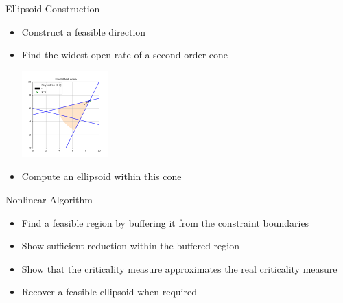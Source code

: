 \documentclass{beamer}
\begin{document}
\begin{frame}{Ellipsoid Construction}
	\begin{itemize}
		\item Construct a feasible direction
		\item Find the widest open rate of a second order cone
		\begin{center}
			\includegraphics[width=125px]{images/unshifted_cone.png}
		\end{center}
		\item Compute an ellipsoid within this cone
	\end{itemize}
\end{frame}

% 	

% 


\begin{frame}{Nonlinear Algorithm}
	\begin{itemize}
		\setlength\itemsep{1.5em}
		\item Find a feasible region by buffering it from the constraint boundaries
		\item Show sufficient reduction within the buffered region
		\item Show that the criticality measure approximates the real criticality measure
		\item Recover a feasible ellipsoid when required
	\end{itemize}
\end{frame}
\end{document}
